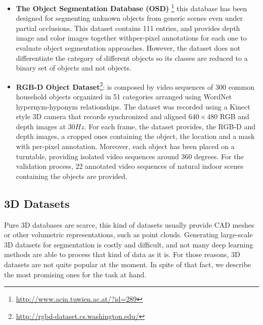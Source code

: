 \begin{itemize}
	\item \textbf{The Object Segmentation Database (OSD)}
	\cite{richtsfeld2012object}\footnote{\url{http://www.acin.tuwien.ac.at/?id=289}}
	this database has been designed for segmenting unknown objects from generic scenes even under partial occlusions. This dataset contains 111 entries, and provides depth image and color images together withper-pixel annotations for each one to evaluate object segmentation approaches. However, the dataset does not differentiate the category of different objects so its classes are reduced to a binary set of objects and not objects.

	\item \textbf{RGB-D Object Dataset}\cite{lai2011large}\footnote{\url{http://rgbd-dataset.cs.washington.edu/}}:
	is composed by video sequences of 300 common household objects organized in 51 categories arranged using WordNet hypernym-hyponym relationships. The dataset was recorded using a Kinect style 3D camera that records synchronized and aligned $640\times480$ RGB and depth images at $30Hz$.	For each frame, the dataset provides, the RGB-D and depth images, a cropped ones containing the object, the location and a mask with per-pixel annotation. Moreover, each object has been placed on a turntable, providing isolated video sequences around 360 degrees. For the validation process, 22 annotated video sequences of natural indoor scenes containing the objects are provided.

\end{itemize}

\subsection{\acs{3D} Datasets}

Pure \acl{3D} databases are scarce, this kind of datasets usually provide \ac{CAD} meshes or other volumetric representations, such as point clouds. Generating large-scale \acs{3D} datasets for segmentation is costly and difficult, and not many deep learning methods are able to process that kind of data as it is. For those reasons, \acs{3D} datasets are not quite popular at the moment. In spite of that fact, we describe the most promising ones for the task at hand.

